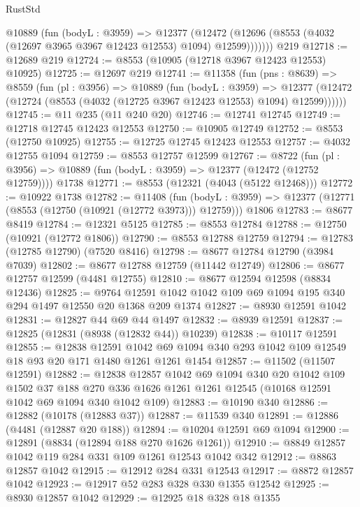 \begin{lexlean}{RustStd}
\begin{coremodule}
        @10889
          (fun (bodyL : @3959) =>
          @12377
            (@12472 (@12696 (@8553 (@4032 (@12697 @3965 @3967 @12423 @12553) @1094) @12599)))))))
    @219
@12718 := @12689 @219
@12724 := @8553 (@10905 (@12718 @3967 @12423 @12553) @10925)
@12725 := @12697 @219
@12741 := @11358
    (fun (pns : @8639) =>
    @8559
      (fun (pl : @3956) =>
      @10889
        (fun (bodyL : @3959) =>
        @12377 (@12472 (@12724 (@8553 (@4032 (@12725 @3967 @12423 @12553) @1094) @12599))))))
@12745 := @11 @235 (@11 @240 @20)
@12746 := @12741 @12745
@12749 := @12718 @12745 @12423 @12553
@12750 := @10905 @12749
@12752 := @8553 (@12750 @10925)
@12755 := @12725 @12745 @12423 @12553
@12757 := @4032 @12755 @1094
@12759 := @8553 @12757 @12599
@12767 := @8722
    (fun (pl : @3956) => @10889 (fun (bodyL : @3959) => @12377 (@12472 (@12752 @12759))))
    @1738
@12771 := @8553 (@12321 (@4043 (@5122 @12468)))
@12772 := @10922 @1738
@12782 := @11408
    (fun (bodyL : @3959) => @12377 (@12771 (@8553 (@12750 (@10921 (@12772 @3973))) @12759)))
    @1806
@12783 := @8677 @8419
@12784 := @12321 @5125
@12785 := @8553 @12784
@12788 := @12750 (@10921 (@12772 @1806))
@12790 := @8553 @12788 @12759
@12794 := @12783 (@12785 @12790) (@7520 @8416)
@12798 := @8677 @12784 @12790 (@3984 @7039)
@12802 := @8677 @12788 @12759 (@11442 @12749)
@12806 := @8677 @12757 @12599 (@4481 @12755)
@12810 := @8677 @12594 @12598 (@8834 @12436)
@12825 := @9764 @12591 @1042 @1042 @109 @69 @1094 @195 @340 @294 @1497 @12550 @20 @1368 @209 @1374
@12827 := @8930 @12591 @1042
@12831 := @12827 @44 @69 @44 @1497
@12832 := @8939 @12591
@12837 := @12825 (@12831 (@8938 (@12832 @44)) @10239)
@12838 := @10117 @12591
@12855 := @12838
    @12591
    @1042
    @69
    @1094
    @340
    @293
    @1042
    @109
    @12549
    @18
    @93
    @20
    @171
    @1480
    @1261
    @1261
    @1454
@12857 := @11502 (@11507 @12591)
@12882 := @12838
    @12857
    @1042
    @69
    @1094
    @340
    @20
    @1042
    @109
    @1502
    @37
    @188
    @270
    @336
    @1626
    @1261
    @1261
    @12545
    (@10168 @12591 @1042 @69 @1094 @340 @1042 @109)
@12883 := @10190 @340
@12886 := @12882 (@10178 (@12883 @37))
@12887 := @11539 @340
@12891 := @12886 (@4481 (@12887 @20 @188))
@12894 := @10204 @12591 @69 @1094
@12900 := @12891 (@8834 (@12894 @188 @270 @1626 @1261))
@12910 := @8849 @12857 @1042 @119 @284 @331 @109 @1261 @12543 @1042 @342
@12912 := @8863 @12857 @1042
@12915 := @12912 @284 @331 @12543
@12917 := @8872 @12857 @1042
@12923 := @12917 @52 @283 @328 @330 @1355 @12542
@12925 := @8930 @12857 @1042
@12929 := @12925 @18 @328 @18 @1355

\end{coremodule}
\end{lexlean}

